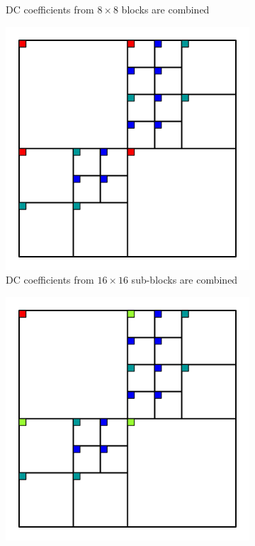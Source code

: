 \documentclass[english,conference,10pt]{IEEEtran}
\begin{document}
\begin{figure}
\begin{subfigure}[t]{0.49\columnwidth}
\caption{DC coefficients from $8\times 8$ blocks are combined}
\end{subfigure}
\begin{subfigure}[t]{0.49\columnwidth}
\includegraphics[width=\columnwidth]{block32_L2}
\caption{DC coefficients from $16\times 16$ sub-blocks are combined}
\end{subfigure}
\begin{subfigure}[t]{0.49\columnwidth}
\includegraphics[width=\columnwidth]{block32_L3}

\end{subfigure}
\end{figure}
\end{document}
